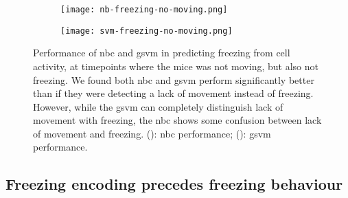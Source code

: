 \begin{figure}[h]
    \begin{subfigure}[h]{\textwidth}
        \texttt{[image: nb-freezing-no-moving.png]}
        \caption{\label{f.ad.nb-freezing-no-moving}}
    \end{subfigure}
    \begin{subfigure}[h]{\textwidth}
        \texttt{[image: svm-freezing-no-moving.png]}
        \caption{\label{f.ad.svm-freezing-no-moving}}
    \end{subfigure}
    \caption[Machine learning classifiers predictions are not based on a lack of movement.]{Performance of  \gls{nbc} and  \gls{gsvm} in predicting freezing from cell activity, at timepoints where the mice was not moving, but also not freezing. We found both \gls{nbc} and \gls{gsvm} perform significantly better than if they were detecting a lack of movement instead of freezing. However, while the \gls{gsvm} can completely distinguish lack of movement with freezing, the \gls{nbc} shows some confusion between lack of movement and freezing. (): \gls{nbc} performance; (): \gls{gsvm} performance. \label{f.ad.accu-freezing-no-moving}}

\end{figure}


\subsection{Freezing encoding precedes freezing behaviour}


